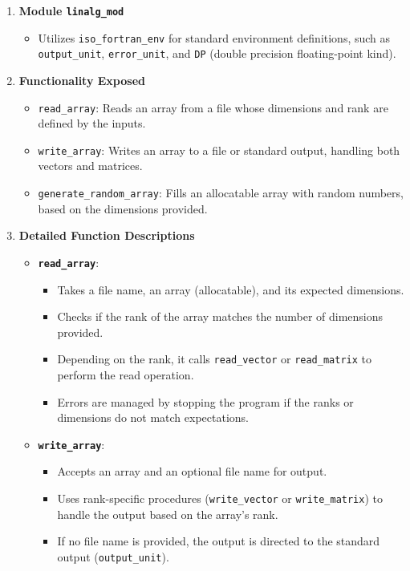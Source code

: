 \begin{enumerate}
\item \textbf{Module \texttt{linalg\_mod}}

\begin{itemize}
\item Utilizes \texttt{iso\_fortran\_env} for standard environment definitions, such as \texttt{output\_unit}, \texttt{error\_unit}, and \texttt{DP} (double precision floating-point kind).
\end{itemize}


\item \textbf{Functionality Exposed}

\begin{itemize}
\item \texttt{read\_array}: Reads an array from a file whose dimensions and rank are defined by the inputs.
\item \texttt{write\_array}: Writes an array to a file or standard output, handling both vectors and matrices.
\item \texttt{generate\_random\_array}: Fills an allocatable array with random numbers, based on the dimensions provided.
\end{itemize}


\item \textbf{Detailed Function Descriptions}

\begin{itemize}
\item \textbf{\texttt{read\_array}}:

\begin{itemize}
\item Takes a file name, an array (allocatable), and its expected dimensions.
\item Checks if the rank of the array matches the number of dimensions provided.
\item Depending on the rank, it calls \texttt{read\_vector} or \texttt{read\_matrix} to perform the read operation.
\item Errors are managed by stopping the program if the ranks or dimensions do not match expectations.
\end{itemize}


\item \textbf{\texttt{write\_array}}:

\begin{itemize}
\item Accepts an array and an optional file name for output.
\item Uses rank-specific procedures (\texttt{write\_vector} or \texttt{write\_matrix}) to handle the output based on the array's rank.
\item If no file name is provided, the output is directed to the standard output (\texttt{output\_unit}).
\end{itemize}



\end{itemize}
\end{enumerate}
